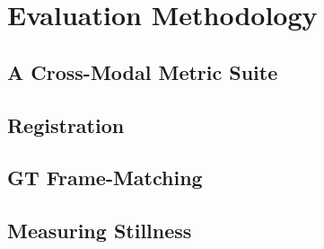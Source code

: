 \chapter{Evaluation Methodology}
\label{chap:evaluation-methodology}

\section{A Cross-Modal Metric Suite}
\label{sec:eval-metrics}

\section{Registration}
\label{sec:eval-registration}

\section{GT Frame-Matching}
\label{sec:eval-framematching}

\section{Measuring Stillness}
\label{sec:eval-stillness}
